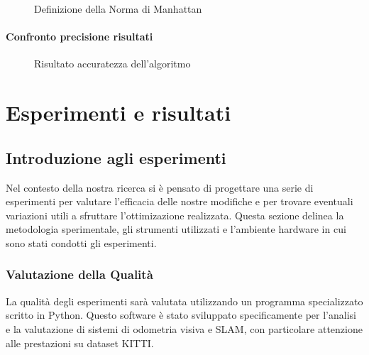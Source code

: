 \documentclass[12pt,a4paper]{report}
\begin{document}
\begin{figure}[H]
    \centering
    \caption{Definizione della Norma di Manhattan}
\end{figure}

\subsubsection{Confronto precisione risultati}

\begin{figure}[H]
    \centering
    \caption{Risultato accuratezza dell'algoritmo}
\end{figure}

\chapter{Esperimenti e risultati}

\section{Introduzione agli esperimenti}

Nel contesto della nostra ricerca si è pensato di progettare una serie di esperimenti per valutare l'efficacia delle nostre modifiche e per trovare eventuali variazioni utili a sfruttare l'ottimizazione realizzata. Questa sezione delinea la metodologia sperimentale, gli strumenti utilizzati e l'ambiente hardware in cui sono stati condotti gli esperimenti.

\subsection{Valutazione della Qualità}

La qualità degli esperimenti sarà valutata utilizzando un programma specializzato scritto in Python. Questo software è stato sviluppato specificamente per l'analisi e la valutazione di sistemi di odometria visiva e SLAM, con particolare attenzione alle prestazioni su dataset KITTI.
\end{document}
